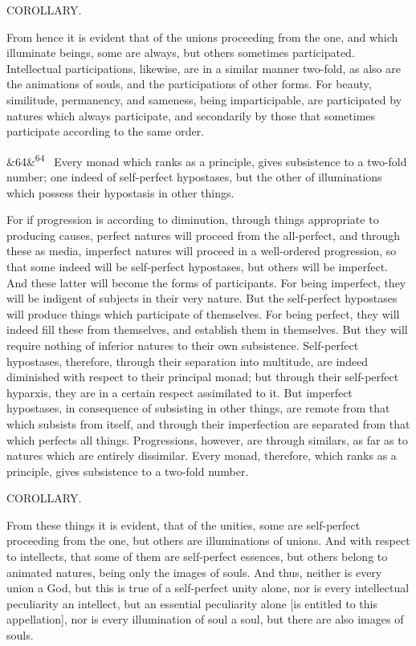 \documentclass[12pt]{article}
\newcommand{\para}[1][]{\par\noindent\ifx&#1&\else\textsuperscript{\footnotesize #1}~\fi}
\begin{document}
COROLLARY.

From hence it is evident that of the unions proceeding from the one, and which illuminate beings, some are always, but others sometimes participated. Intellectual participations, likewise, are in a similar manner two-fold, as also are the animations of souls, and the participations of other forms. For beauty, similitude, permanency, and sameness, being imparticipable, are participated by natures which always participate, and secondarily by those that sometimes participate according to the same order.

\para[64] Every monad which ranks as a principle, gives subsistence to a two-fold number; one indeed of self-perfect hypostases, but the other of illuminations which possess their hypostasis in other things.

For if progression is according to diminution, through things appropriate to producing causes, perfect natures will proceed from the all-perfect, and through these as media, imperfect natures will proceed in a well-ordered progression, so that some indeed will be self-perfect hypostases, but others will be imperfect. And these latter will become the forms of participants. For being imperfect, they will be indigent of subjects in their very nature. But the self-perfect hypostases will produce things which participate of themselves. For being perfect, they will indeed fill these from themselves, and establish them in themselves. But they will require nothing of inferior natures to their own subsistence. Self-perfect hypostases, therefore, through their separation into multitude, are indeed diminished with respect to their principal monad; but through their self-perfect hyparxis, they are in a certain respect assimilated to it. But imperfect hypostases, in consequence of subsisting in other things, are remote from that which subsists from itself, and through their imperfection are separated from that which perfects all things. Progressions, however, are through similars, as far as to natures which are entirely dissimilar. Every monad, therefore, which ranks as a principle, gives subsistence to a two-fold number.

COROLLARY.

From these things it is evident, that of the unities, some are self-perfect proceeding from the one, but others are illuminations of unions. And with respect to intellects, that some of them are self-perfect essences, but others belong to animated natures, being only the images of souls. And thus, neither is every union a God, but this is true of a self-perfect unity alone, nor is every intellectual peculiarity an intellect, but an essential peculiarity alone [is entitled to this appellation], nor is every illumination of soul a soul, but there are also images of souls.
\end{document}

